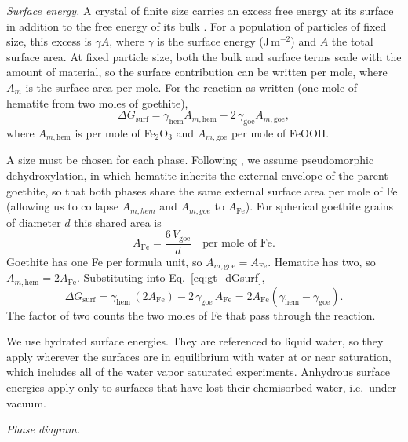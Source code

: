\textit{Surface energy.} A crystal of finite size carries an excess free energy at its
surface in addition to the free energy of its bulk \citep{gibbs1878}. For a population of
particles of fixed size, this excess is $\gamma A$, where $\gamma$ is the surface energy
(J\,m$^{-2}$) and $A$ the total surface area. At fixed particle size, both the bulk and surface terms scale with the
amount of material, so the surface contribution can be written per mole, where $A_m$ is the surface area per mole. 
For the reaction as written (one mole of hematite from two moles of goethite),
\begin{equation}
  \Delta G_{\mathrm{surf}} = \gamma_{\mathrm{hem}} A_{m,\mathrm{hem}} - 2\,\gamma_{\mathrm{goe}} A_{m,\mathrm{goe}},
  \label{eq:gt_dGsurf}
\end{equation}
where $A_{m,\mathrm{hem}}$ is per mole of Fe$_2$O$_3$ and $A_{m,\mathrm{goe}}$ per mole of FeOOH.

A size must be chosen for each phase. Following \citet{navrotsky2008}, we assume pseudomorphic dehydroxylation, 
in which hematite inherits the external envelope of the parent goethite, so that both phases share the same
external surface area per mole of Fe (allowing us to collapse $A_{m,hem}$ and $A_{m,goe}$ to $A_{\mathrm{Fe}}$). 
For spherical goethite grains of diameter $d$ this shared area is
\begin{equation}
  A_{\mathrm{Fe}} = \frac{6\,V_{\mathrm{goe}}}{d}\quad\text{per mole of Fe}.
\end{equation}
Goethite has one Fe per formula unit, so $A_{m,\mathrm{goe}} = A_{\mathrm{Fe}}$. Hematite has two,
so $A_{m,\mathrm{hem}} = 2A_{\mathrm{Fe}}$. Substituting into Eq.~\eqref{eq:gt_dGsurf},
\begin{equation}
  \Delta G_{\mathrm{surf}} = \gamma_{\mathrm{hem}}\,(2A_{\mathrm{Fe}}) - 2\,\gamma_{\mathrm{goe}}\,A_{\mathrm{Fe}}
  = 2A_{\mathrm{Fe}}\left(\gamma_{\mathrm{hem}} - \gamma_{\mathrm{goe}}\right).
  \label{eq:gt_equalarea}
\end{equation}
The factor of two counts the two moles of Fe that pass through the reaction. 

We use hydrated surface energies. They are referenced to liquid water, so they apply wherever the
surfaces are in equilibrium with water at or near saturation, which includes all of the water vapor saturated experiments. Anhydrous surface energies apply only to surfaces that have lost their
chemisorbed water, i.e.\ under vacuum.

\textit{Phase diagram.}

